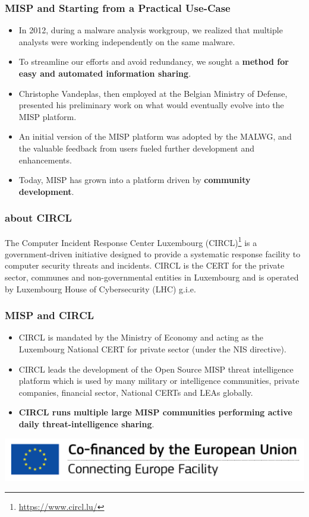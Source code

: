 
\begin{frame}[t,plain]
\titlepage
\end{frame}

\begin{frame}
 \frametitle{MISP and Starting from a Practical Use-Case}
 \begin{itemize}
         \item In 2012, during a malware analysis workgroup, we realized that multiple analysts were working independently on the same malware.
         \item To streamline our efforts and avoid redundancy, we sought a {\bf method for easy and automated information sharing}.
         \item Christophe Vandeplas, then employed at the Belgian Ministry of Defense, presented his preliminary work on what would eventually evolve into the MISP platform.
         \item An initial version of the MISP platform was adopted by the MALWG, and the valuable feedback from users fueled further development and enhancements.
         \item Today, MISP has grown into a platform driven by {\bf community development}.
 \end{itemize}
\end{frame}

\begin{frame}
\frametitle{about CIRCL}
    The Computer Incident Response Center Luxembourg (CIRCL)\footnote{\url{https://www.circl.lu/}} is a government-driven initiative designed to provide a systematic response facility to computer security threats and incidents. CIRCL is the CERT for the private sector, communes and non-governmental entities in Luxembourg and is operated by Luxembourg House of Cybersecurity (LHC) g.i.e.
\end{frame}

\begin{frame}
\frametitle{MISP and CIRCL}
\begin{itemize}
    \item CIRCL is mandated by the Ministry of Economy and acting as the Luxembourg National CERT for private sector (under the NIS directive).
\item CIRCL leads the development of the Open Source MISP threat intelligence platform which is used by many military or intelligence communities, private companies, financial sector, National CERTs and LEAs globally.
\item {\bf CIRCL runs multiple large MISP communities performing active daily threat-intelligence sharing}.
\end{itemize}
        \includegraphics{en_cef.png}
\end{frame}

